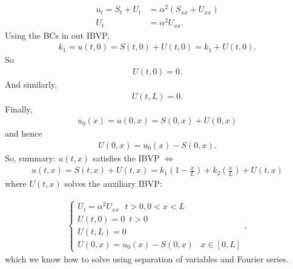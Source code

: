 \documentclass{article}
\theoremstyle{definition}
\begin{document}
\begin{align*}
u_t = S_t + U_t &= \alpha^2 (S_{xx} + U_{xx})\\
U_t &= \alpha^2 U_{xx}.
\end{align*}
Using the BCs in out IBVP,
\begin{align*}
k_1 = u(t,0) = S(t,0) + U(t,0) = k_1 + U(t,0).
\end{align*}
So
\begin{align*}
U(t,0) = 0.
\end{align*}
And similarly,
\begin{align*}
U(t,L) = 0.
\end{align*}
Finally, 
\begin{align*}
u_0(x) = u(0,x) = S(0,x) + U(0,x)
\end{align*}
and hence
\begin{align*}
U(0,x) = u_0(x) - S(0,x).
\end{align*}
So, summary: $u(t,x)$ satisfies the IBVP $\iff$ 
\begin{align*}
u(t,x)=S(t,x)+U(t,x) = k_1\left( 1 - \frac{x}{L} \right) + k_2\left(\frac{x}{L} \right) + U(t,x)
\end{align*}
where $U(t,x)$ solves the auxiliary IBVP:


\begin{align*}
\begin{cases}
U_t = \alpha^2U_{xx}\,\,\,\, t>0,0<x<L\\
U(t,0) = 0\,\,\, t> 0\\
U(t,L) = 0\\
U(0,x) = u_0(x) - S(0,x)\,\,\,\,\, x\in[0,L]
\end{cases},
\end{align*}
which we know how to solve using separation of variables and Fourier series. 
\end{document}
